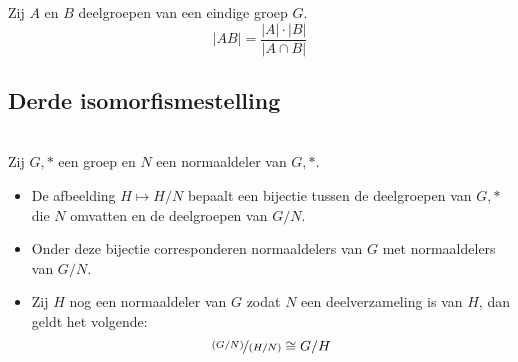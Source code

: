 \documentclass[main.tex]{subfiles}
\begin{document}
\begin{st}
  Zij $A$ en $B$ deelgroepen van een eindige groep $G$.
  \[ |AB| = \frac{|A|\cdot|B|}{|A\cap B|} \]
  \zb
\end{st}

\subsection{Derde isomorfismestelling}

\begin{st}
  \label{st:groepen-derde-isomorfismestelling}
  \\
  Zij $G,*$ een groep en $N$ een normaaldeler van $G,*$.
  \begin{itemize}
  \item De afbeelding $H \mapsto H/N$ bepaalt een bijectie tussen de deelgroepen van $G,*$ die $N$ omvatten en de deelgroepen van $G/N$.
  \item Onder deze bijectie corresponderen normaaldelers van $G$ met normaaldelers van $G/N$.
  \item Zij $H$ nog een normaaldeler van $G$ zodat $N$ een deelverzameling is van $H$, dan geldt het volgende:
    \[ \nicefrac{(G/N)}{(H/N)} \cong G/H\]
  \end{itemize}


\end{st}
\end{document}

